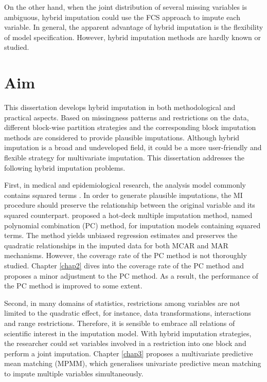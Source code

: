 On the other hand, when the joint distribution of several missing variables is ambiguous, hybrid imputation could use the FCS approach to impute each variable. In general, the apparent advantage of hybrid imputation is the flexibility of model specification. However, hybrid imputation methods are hardly known or studied. 

\section{Aim}
This dissertation develops hybrid imputation in both methodological and practical aspects. Based on missingness patterns and restrictions on the data, different block-wise partition strategies and the corresponding block imputation methods are considered to provide plausible imputations. Although hybrid imputation is a broad and undeveloped field, it could be a more user-friendly and flexible strategy for multivariate imputation. This dissertation addresses the following hybrid imputation problems. 

First, in medical and epidemiological research, the analysis model commonly contains squared terms \citep{seaman2012multiple, bartlett2015multiple}. In order to generate plausible imputations, the MI procedure should preserve the relationship between the original variable and its squared counterpart. \citet{Vink2013} proposed a hot-deck multiple imputation method, named polynomial combination (PC) method, for imputation models containing squared terms. The method yields unbiased regression estimates and preserves the quadratic relationships in the imputed data for both MCAR and MAR mechanisms. However, the coverage rate of the PC method is not thoroughly studied. Chapter \ref{chap2} dives into the coverage rate of the PC method and proposes a minor adjustment to the PC method. As a result, the performance of the PC method is improved to some extent.  

Second, in many domains of statistics, restrictions among variables are not limited to the quadratic effect, for instance, data transformations, interactions and range restrictions. Therefore, it is sensible to embrace all relations of scientific interest in the imputation model. With hybrid imputation strategies, the researcher could set variables involved in a restriction into one block and perform a joint imputation. Chapter \ref{chap3} proposes a multivariate predictive mean matching (MPMM), which generalises univariate predictive mean matching \citep{rubin1986statistical, little1988missing} to impute multiple variables simultaneously. 

